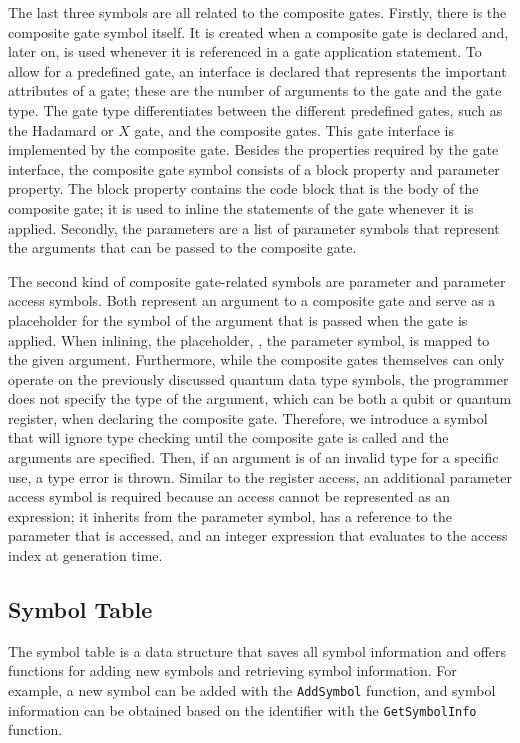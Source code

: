 The last three symbols are all related to the composite gates. Firstly, there is the composite gate symbol itself. It is created when a composite gate is declared and, later on, is used whenever it is referenced in a gate application statement. To allow for a predefined gate, an interface is declared that represents the important attributes of a gate; these are the number of arguments to the gate and the gate type. The gate type differentiates between the different predefined gates, such as the Hadamard or $X$ gate, and the composite gates. This gate interface is implemented by the composite gate. Besides the properties required by the gate interface, the composite gate symbol consists of a block property and parameter property. The block property contains the code block that is the body of the composite gate; it is used to inline the statements of the gate whenever it is applied. Secondly, the parameters are a list of parameter symbols that represent the arguments that can be passed to the composite gate.

The second kind of composite gate-related symbols are parameter and parameter access symbols. Both represent an argument to a composite gate and serve as a placeholder for the symbol of the argument that is passed when the gate is applied. When inlining, the placeholder, \ie, the parameter symbol, is mapped to the given argument. Furthermore, while the composite gates themselves can only operate on the previously discussed quantum data type symbols, the programmer does not specify the type of the argument, which can be both a qubit or quantum register, when declaring the composite gate. Therefore, we introduce a symbol that will ignore type checking until the composite gate is called and the arguments are specified. Then, if an argument is of an invalid type for a specific use, a type error is thrown. Similar to the register access, an additional parameter access symbol is required because an access cannot be represented as an expression; it inherits from the parameter symbol, has a reference to the parameter that is accessed, and an integer expression that evaluates to the access index at generation time.

\subsection{Symbol Table}
\label{sec:implementation_symbolTable}
The symbol table is a data structure that saves all symbol information and offers functions for adding new symbols and retrieving symbol information. For example, a new symbol can be added with the \texttt{AddSymbol} function, and symbol information can be obtained based on the identifier with the \texttt{GetSymbolInfo} function.

